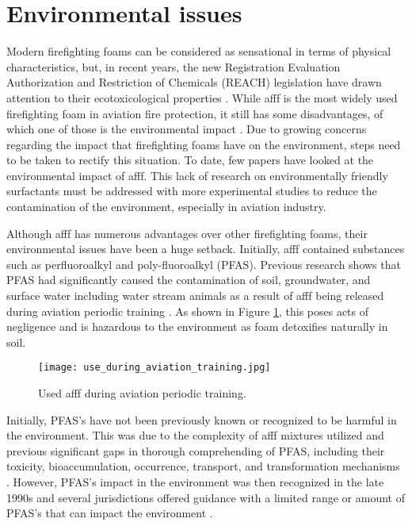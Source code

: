 \section{Environmental issues}
Modern firefighting foams can be considered as sensational in terms of physical characteristics, but, in recent years, the new Registration Evaluation Authorization and Restriction of Chemicals (REACH) legislation have drawn attention to their ecotoxicological properties \cite{turekova2011environmental}. While \acrshort{afff} is the most widely used firefighting foam in aviation fire protection, it still has some disadvantages, of which one of those is the environmental impact \cite{zhao2016improving}. Due to growing concerns regarding the impact that firefighting foams have on the environment, steps need to be taken to rectify this situation. To date, few papers have looked at the environmental impact of \acrshort{afff}. This lack of research on environmentally friendly surfactants must be addressed with more experimental studies to reduce the contamination of the environment, especially in aviation industry.

Although \acrshort{afff} has numerous advantages over other firefighting foams, their environmental issues have been a huge setback. Initially, \acrshort{afff} contained substances such as perfluoroalkyl and poly-fluoroalkyl (PFAS). Previous research shows that PFAS had significantly caused the contamination of soil, groundwater, and surface water including water stream animals as a result of \acrshort{afff} being released during aviation periodic training \cite{milley2018estimating}. As shown in Figure \ref{ch2:figure:use}, this poses acts of negligence and is hazardous to the environment as foam detoxifies naturally in soil.

\begin{figure}[H]
    \centering
    \texttt{[image: use\_during\_aviation\_training.jpg]}
    \caption{Used \acrshort{afff} during aviation periodic training.}
    \label{ch2:figure:use}
\end{figure}

Initially, PFAS's have not been previously known or recognized to be harmful in the environment. This was due to the complexity of \acrshort{afff} mixtures utilized and previous significant gaps in thorough comprehending of PFAS, including their toxicity, bioaccumulation, occurrence, transport, and transformation mechanisms \cite{milley2018estimating}. However, PFAS's impact in the environment was then recognized in the late 1990s and several jurisdictions offered guidance with a limited range or amount of PFAS's that can impact the environment \cite{hinnant2017influence}.

